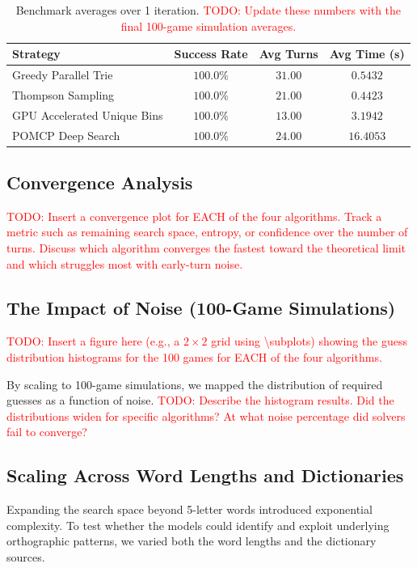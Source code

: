 \documentclass[12pt, a4paper]{article}
\begin{document}
\begin{table}[H]
    \centering
    \begin{tabular}{lccc}
        \toprule
        \textbf{Strategy} & \textbf{Success Rate} & \textbf{Avg Turns} & \textbf{Avg Time (s)} \\
        \midrule
        Greedy Parallel Trie & $100.0\%$ & $31.00$ & $0.5432$ \\
        Thompson Sampling & $100.0\%$ & $21.00$ & $0.4423$ \\
        GPU Accelerated Unique Bins & $100.0\%$ & $13.00$ & $3.1942$ \\
        POMCP Deep Search & $100.0\%$ & $24.00$ & $16.4053$ \\
        \bottomrule
    \end{tabular}
    \caption{Benchmark averages over 1 iteration. \textcolor{red}{TODO: Update these numbers with the final 100-game simulation averages.}}
    \label{tab:benchmarks}
\end{table}

\subsection{Convergence Analysis}
\textcolor{red}{TODO: Insert a convergence plot for EACH of the four algorithms. Track a metric such as remaining search space, entropy, or confidence over the number of turns. Discuss which algorithm converges the fastest toward the theoretical limit and which struggles most with early-turn noise.}

\subsection{The Impact of Noise (100-Game Simulations)}
\textcolor{red}{TODO: Insert a figure here (e.g., a $2 \times 2$ grid using \textbackslash subplots) showing the guess distribution histograms for the 100 games for EACH of the four algorithms.}

By scaling to 100-game simulations, we mapped the distribution of required guesses as a function of noise. \textcolor{red}{TODO: Describe the histogram results. Did the distributions widen for specific algorithms? At what noise percentage did solvers fail to converge?}

\subsection{Scaling Across Word Lengths and Dictionaries}
Expanding the search space beyond 5-letter words introduced exponential complexity. To test whether the models could identify and exploit underlying orthographic patterns, we varied both the word lengths and the dictionary sources.
\end{document}
